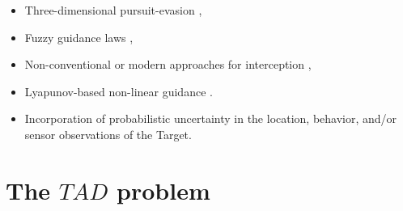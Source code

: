 \begin{itemize}
	\item Three-dimensional pursuit-evasion \cite{adler1956missile,shinar1980three,lin2010development,gutman20103d},
	\item Fuzzy guidance laws \cite{pham2012fuzzy,li2014fuzzy},
	\item Non-conventional or modern approaches for interception \cite{nesline2012new,shinar2009meeting},
	\item Lyapunov-based non-linear guidance \cite{lechevin2004lyapunov}.
	\item Incorporation of probabilistic uncertainty in the location, behavior, and/or sensor observations of the Target.
	
\end{itemize}



\section{The $ TAD $ problem}  \label{TADsection}


